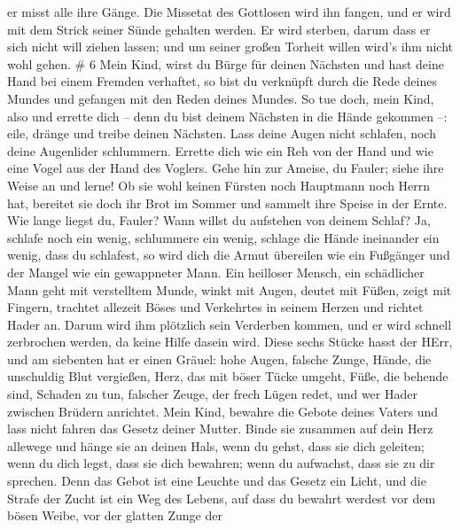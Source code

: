 er misst alle ihre Gänge.  Die Missetat des Gottlosen wird
ihn fangen, und er wird mit dem Strick seiner Sünde gehalten werden.
 Er wird sterben, darum dass er sich nicht will ziehen
lassen; und um seiner großen Torheit willen wird's ihm nicht wohl gehen.
\# 6  Mein Kind, wirst du Bürge für deinen Nächsten und hast
deine Hand bei einem Fremden verhaftet,  so bist du
verknüpft durch die Rede deines Mundes und gefangen mit den Reden deines
Mundes.  So tue doch, mein Kind, also und errette dich --
denn du bist deinem Nächsten in die Hände gekommen --: eile, dränge und
treibe deinen Nächsten.  Lass deine Augen nicht schlafen,
noch deine Augenlider schlummern.  Errette dich wie ein Reh
von der Hand und wie eine Vogel aus der Hand des Voglers. 
Gehe hin zur Ameise, du Fauler; siehe ihre Weise an und lerne!
 Ob sie wohl keinen Fürsten noch Hauptmann noch Herrn hat,
 bereitet sie doch ihr Brot im Sommer und sammelt ihre
Speise in der Ernte.  Wie lange liegst du, Fauler? Wann
willst du aufstehen von deinem Schlaf?  Ja, schlafe noch
ein wenig, schlummere ein wenig, schlage die Hände ineinander ein wenig,
dass du schlafest,  so wird dich die Armut übereilen wie
ein Fußgänger und der Mangel wie ein gewappneter Mann.  Ein
heilloser Mensch, ein schädlicher Mann geht mit verstelltem Munde,
 winkt mit Augen, deutet mit Füßen, zeigt mit Fingern,
 trachtet allezeit Böses und Verkehrtes in seinem Herzen
und richtet Hader an.  Darum wird ihm plötzlich sein
Verderben kommen, und er wird schnell zerbrochen werden, da keine Hilfe
dasein wird.  Diese sechs Stücke hasst der HErr, und am
siebenten hat er einen Gräuel:  hohe Augen, falsche Zunge,
Hände, die unschuldig Blut vergießen,  Herz, das mit böser
Tücke umgeht, Füße, die behende sind, Schaden zu tun, 
falscher Zeuge, der frech Lügen redet, und wer Hader zwischen Brüdern
anrichtet.  Mein Kind, bewahre die Gebote deines Vaters und
lass nicht fahren das Gesetz deiner Mutter.  Binde sie
zusammen auf dein Herz allewege und hänge sie an deinen Hals,
 wenn du gehst, dass sie dich geleiten; wenn du dich legst,
dass sie dich bewahren; wenn du aufwachst, dass sie zu dir sprechen.
 Denn das Gebot ist eine Leuchte und das Gesetz ein Licht,
und die Strafe der Zucht ist ein Weg des Lebens,  auf dass
du bewahrt werdest vor dem bösen Weibe, vor der glatten Zunge der
